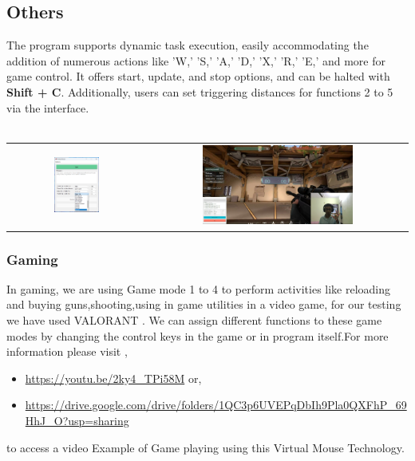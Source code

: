 \documentclass[12pt,a4paper]{report}
\begin{document}
		\subsection{Others} The program supports dynamic task execution, easily accommodating the addition of numerous actions like 'W,' 'S,' 'A,' 'D,' 'X,' 'R,' 'E,' and more for game control. It offers start, update, and stop options, and can be halted with \textbf{Shift + C}. Additionally, users can set triggering distances for functions 2 to 5 via the interface.
				\\ \\
				    \begin{tabular}{c c}
\includegraphics[width=0.35\textwidth]{goptions} & \includegraphics[width=0.6\textwidth]{gplay}
    \end{tabular} 
    \subsubsection{Gaming}
		In gaming, we are using Game mode 1 to 4 to perform activities like reloading and buying  guns,shooting,using in game utilities in a video game, for our testing we have used VALORANT . We can assign different functions to these game modes by changing the control keys in the game or in program itself.For more information please visit ,
		\begin{itemize}
    \item \url{https://youtu.be/2ky4_TPi58M}  or,
    \item \url{https://drive.google.com/drive/folders/1QC3p6UVEPqDbIh9Pla0QXFhP_69HhJ_O?usp=sharing}
\end{itemize}
 to access a video Example of Game playing using this Virtual Mouse Technology.
\end{document}
